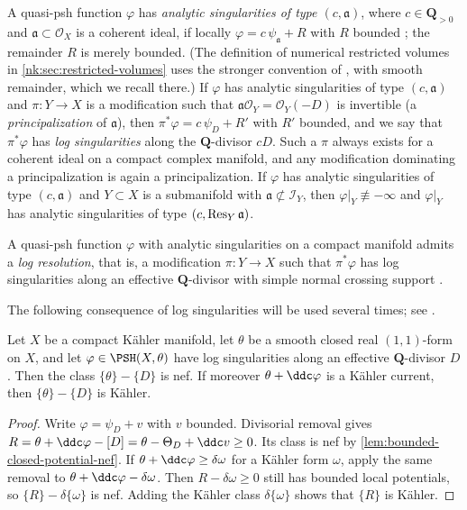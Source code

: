 A quasi-psh function $\varphi$ has \emph{analytic singularities of type
$(c,\mathfrak a)$}, where $c\in\mathbf Q_{>0}$ and $\mathfrak a\subset\mathcal O_X$ is a coherent
ideal, if locally $\varphi=c\,\psi_\mathfrak a+R$ with $R$ bounded
\cite[Definition~1.6.1]{SGPT}; the remainder $R$ is merely bounded.
(The definition of numerical restricted volumes in
\cref{nk:sec:restricted-volumes} uses the stronger convention of
\cite[Section~2]{CT22Restricted}, with smooth remainder, which we recall there.)
If $\varphi$ has analytic singularities of type
$(c,\mathfrak a)$ and $\pi\colon Y\to X$ is a modification such that
$\mathfrak a\mathcal O_Y=\mathcal O_Y(-D)$ is invertible (a \emph{principalization} of
$\mathfrak a$), then $\pi^*\varphi=c\,\psi_D+R'$ with $R'$ bounded, and we
say that $\pi^*\varphi$ has \emph{log singularities} along the
$\mathbf Q$-divisor $cD$. Such a $\pi$ always exists for a coherent ideal
on a compact complex manifold, and any modification dominating a
principalization is again a principalization. If $\varphi$ has analytic
singularities of type $(c,\mathfrak a)$ and $Y\subset X$ is a submanifold with
$\mathfrak a\not\subset\mathcal I_Y$, then $\varphi|_Y\not\equiv-\infty$ and
$\varphi|_Y$ has analytic singularities of type $(c,\operatorname{Res}_{Y}\mathfrak a)$.

A quasi-psh function $\varphi$ with analytic singularities on a compact
manifold admits a \emph{log resolution},
that is, a modification $\pi\colon Y\to X$ such that $\pi^*\varphi$ has
log singularities along an effective $\mathbf Q$-divisor with simple normal
crossing support \cite[Theorem~1.6.1]{SGPT}.

The following consequence of log singularities will be used several
times; see \cite[Lemma~1.6.1]{SGPT}.

\begin{lemma}\label{nk:lem:residual-nef}
Let $X$ be a compact K\"ahler manifold, let $\theta$ be a smooth
closed real $(1,1)$-form on $X$, and let $\varphi\in\PSH(X,\theta)$
have log singularities along an effective $\mathbf Q$-divisor $D$.
Then the class $\{\theta\}-\{D\}$ is nef. If moreover
$\theta+\ddc\varphi$ is a K\"ahler current, then $\{\theta\}-\{D\}$
is K\"ahler.
\end{lemma}
\begin{proof}
Write $\varphi=\psi_D+v$ with $v$ bounded. Divisorial removal gives
$R=\theta+\ddc\varphi-[D]=\theta-\Theta_D+\ddc v\geq0$.
Its class is nef by \cref{lem:bounded-closed-potential-nef}.
If $\theta+\ddc\varphi\geq\delta\omega$ for a K\"ahler form $\omega$,
apply the same removal to $\theta+\ddc\varphi-\delta\omega$.
Then $R-\delta\omega\geq0$ still has bounded local potentials, so
$\{R\}-\delta\{\omega\}$ is nef. Adding the K\"ahler class
$\delta\{\omega\}$ shows that $\{R\}$ is K\"ahler.
\end{proof}



